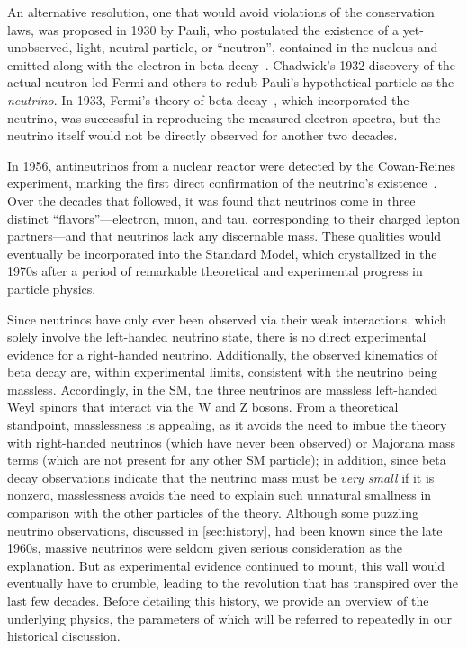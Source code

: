 \documentclass[../thesis.tex]{subfiles}
\begin{document}
An alternative resolution, one that would avoid violations of the conservation laws, was proposed in 1930 by Pauli, who postulated the existence of a yet-unobserved, light, neutral particle, or ``neutron'', contained in the nucleus and emitted along with the electron in beta decay~\cite{Pauli:83282}. Chadwick's 1932 discovery of the actual neutron led Fermi and others to redub Pauli's hypothetical particle as the \emph{neutrino}. In 1933, Fermi's theory of beta decay~\cite{Fermi1934TentativoDU}, which incorporated the neutrino, was successful in reproducing the measured electron spectra, but the neutrino itself would not be directly observed for another two decades.

In 1956, antineutrinos from a nuclear reactor were detected by the Cowan-Reines experiment, marking the first direct confirmation of the neutrino's existence~\cite{Cowan103}. Over the decades that followed, it was found that neutrinos come in three distinct ``flavors''---electron, muon, and tau, corresponding to their charged lepton partners---and that neutrinos lack any discernable mass. These qualities would eventually be incorporated into the Standard Model, which crystallized in the 1970s after a period of remarkable theoretical and experimental progress in particle physics.

Since neutrinos have only ever been observed via their weak interactions, which solely involve the left-handed neutrino state, there is no direct experimental evidence for a right-handed neutrino. Additionally, the observed kinematics of beta decay are, within experimental limits, consistent with the neutrino being massless. Accordingly, in the SM, the three neutrinos are massless left-handed Weyl spinors that interact via the W and Z bosons. From a theoretical standpoint, masslessness is appealing, as it avoids the need to imbue the theory with right-handed neutrinos (which have never been observed) or Majorana mass terms (which are not present for any other SM particle); in addition, since beta decay observations indicate that the neutrino mass must be \emph{very small} if it is nonzero, masslessness avoids the need to explain such unnatural smallness in comparison with the other particles of the theory. Although some puzzling neutrino observations, discussed in \ref{sec:history}, had been known since the late 1960s, massive neutrinos were seldom given serious consideration as the explanation. But as experimental evidence continued to mount, this wall would eventually have to crumble, leading to the revolution that has transpired over the last few decades. Before detailing this history, we provide an overview of the underlying physics, the parameters of which will be referred to repeatedly in our historical discussion.
\end{document}
